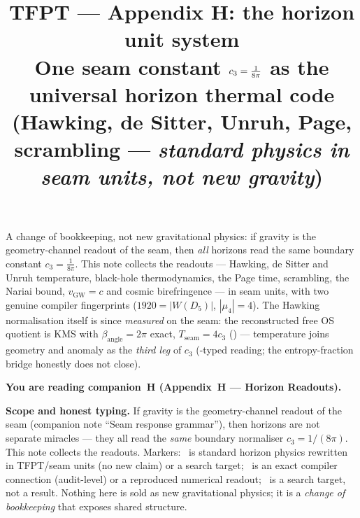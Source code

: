 \documentclass[11pt,a4paper]{article}
\title{\vspace{-1.2cm}\textbf{TFPT --- Appendix H: the horizon unit system}\\[2mm]
\large One seam constant $\cthree=\tfrac1{8\pi}$ as the universal horizon thermal code\\
(Hawking, de Sitter, Unruh, Page, scrambling --- \emph{standard physics in seam units, not new gravity})}
\author{\TFPTauthors}\date{\TFPTdatestamp}
\newcommand{\cthree}{c_3}
\begin{document}
\maketitle
\vspace{-0.6cm}

\begin{keybox}
A change of bookkeeping, not new gravitational physics: if gravity is the geometry-channel readout of the
seam, then \emph{all} horizons read the same boundary constant $c_3=\tfrac1{8\pi}$. This note collects the
readouts --- Hawking, de Sitter and Unruh temperature, black-hole thermodynamics, the Page time,
scrambling, the Nariai bound, $v_{\mathrm{GW}}=c$ and cosmic birefringence --- in seam units, with two
genuine compiler fingerprints ($1920=|W(D_5)|$, $|\mu_4|=4$). The Hawking normalisation itself is
since \emph{measured} on the seam: the reconstructed free OS quotient is KMS with
$\beta_{\mathrm{angle}}=2\pi$ exact, $T_{\mathrm{seam}}=4c_3$
() --- temperature joins geometry and anomaly
as the \emph{third leg} of $c_3$ (\mC-typed reading; the entropy-fraction bridge honestly does
not close).
\end{keybox}

\tableofcontents


\noindent\textbf{You are reading \textbf{companion~H} (Appendix~H --- Horizon Readouts).}


\TFPTbadges
\TFPTclaimstack[frontier]

\bigskip

\par\smallskip\noindent\textbf{Scope and honest typing.}
If gravity is the geometry-channel readout of the seam (companion note ``Seam response grammar''), then
horizons are not separate miracles --- they all read the \emph{same} boundary normaliser $\cthree=1/(8\pi)$.
This note collects the readouts. Markers: \mC\ is standard horizon physics rewritten in TFPT/seam units
(no new claim) or a search target; \mE\ is an exact compiler connection (audit-level) or a reproduced
numerical readout; \mO\ is a search target, not a result. Nothing
here is sold as new gravitational physics; it is a \emph{change of bookkeeping} that exposes shared
structure.
\end{document}
